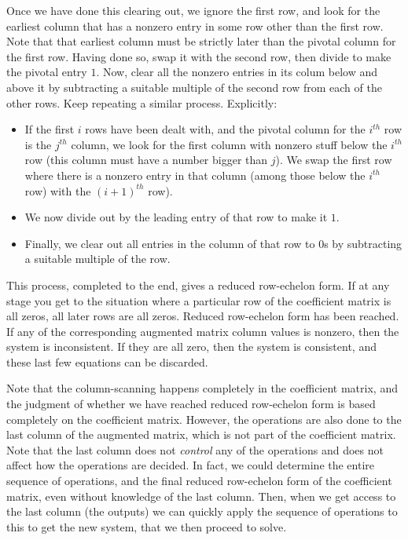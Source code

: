\documentclass[10pt]{amsart}
\begin{document}
Once we have done this clearing out, we ignore the first row, and look
for the earliest column that has a nonzero entry in some row other
than the first row. Note that that earliest column must be strictly
later than the pivotal column for the first row. Having done so, swap
it with the second row, then divide to make the pivotal entry
$1$. Now, clear all the nonzero entries in its colum below and above
it by subtracting a suitable multiple of the second row from each of
the other rows. Keep repeating a similar process. Explicitly:

\begin{itemize}
\item If the first $i$ rows have been dealt with, and the pivotal
  column for the $i^{th}$ row is the $j^{th}$ column, we look for the
  first column with nonzero stuff below the $i^{th}$ row (this column
  must have a number bigger than $j$). We swap the first row where
  there is a nonzero entry in that column (among those below the
  $i^{th}$ row) with the $(i+1)^{th}$ row).
\item We now divide out by the leading entry of that row to make it $1$.
\item Finally, we clear out all entries in the column of that row to
  $0$s by subtracting a suitable multiple of the row.
\end{itemize}

This process, completed to the end, gives a reduced row-echelon
form. If at any stage you get to the situation where a particular row
of the coefficient matrix is all zeros, all later rows are all
zeros. Reduced row-echelon form has been reached. If any of the
corresponding augmented matrix column values is nonzero, then the
system is inconsistent. If they are all zero, then the system is
consistent, and these last few equations can be discarded.

Note that the column-scanning happens completely in the coefficient
matrix, and the judgment of whether we have reached reduced
row-echelon form is based completely on the coefficient
matrix. However, the operations are also done to the last column of
the augmented matrix, which is not part of the coefficient
matrix. Note that the last column does not {\em control} any of the
operations and does not affect how the operations are decided. In
fact, we could determine the entire sequence of operations, and the
final reduced row-echelon form of the coefficient matrix, even without
knowledge of the last column. Then, when we get access to the last
column (the outputs) we can quickly apply the sequence of operations
to this to get the new system, that we then proceed to solve.
\end{document}
